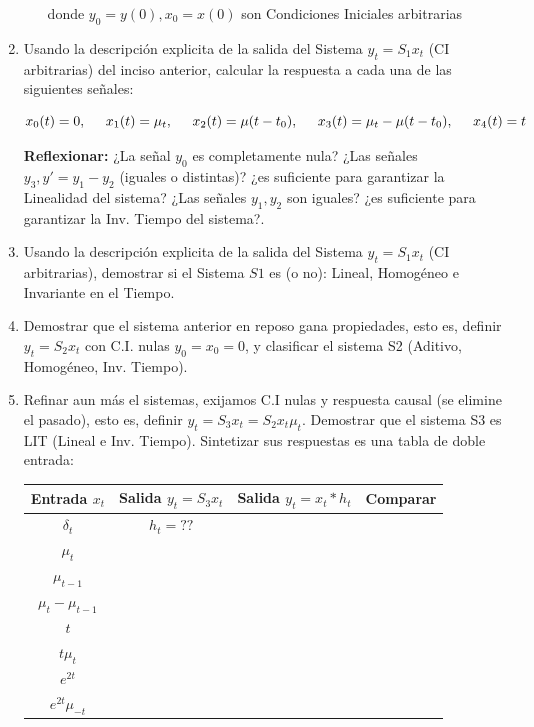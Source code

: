 \documentclass[12pt,a4paper]{report}
\begin{document}
\begin{enumerate}[label=\alph*)]
\begin{itemize}
          donde $y_0 = y(0), x_0 = x(0)$ son Condiciones Iniciales arbitrarias
        \end{itemize}

    \item Usando la descripción explicita de la salida del Sistema $y_t = S_1{x_t}$ (CI arbitrarias) del inciso
      anterior, calcular la respuesta a cada una de las siguientes señales:

      $$x_0(t) = 0, \hspace{0.5cm}x_1(t) = \mu_t, \hspace{0.5cm}x_2(t) = \mu(t - t_0), \hspace{0.5cm}x_3(t) =
      \mu_t - \mu(t - t_0), \hspace{0.5cm}x_4(t) = t$$

      \textbf{Reflexionar:} ¿La señal $y_0$ es completamente nula? ¿Las señales $y_3, y' = y_1 - y_2$ (iguales o
      distintas)? ¿es suficiente para garantizar la Linealidad del sistema? ¿Las señales $y_1, y_2$ son iguales? ¿es
      suficiente para garantizar la Inv. Tiempo del sistema?.

    \item Usando la descripción explicita de la salida del Sistema $y_t = S_1{x_t}$ (CI arbitrarias), demostrar si el
      Sistema $S1$ es (o no): Lineal, Homogéneo e Invariante en el Tiempo.

    \item Demostrar que el sistema anterior en reposo gana propiedades, esto es, definir $y_t = S_2{x_t}$ con C.I. 
      nulas $y_0 = x_0 = 0$, y clasificar el sistema S2 (Aditivo, Homogéneo, Inv. Tiempo).

    \item Refinar aun más el sistemas, exijamos C.I nulas y respuesta causal (se elimine el pasado), esto es, definir 
      $y_t = S_3{x_t} = S_2{x_t} \mu_t$. Demostrar que el sistema S3 es LIT (Lineal e Inv. Tiempo). Sintetizar sus 
      respuestas es una tabla de doble entrada:

      \begin{table}[h!]
        \centering
        \begin{tabular}{|c|c|c|c|}
          \hline
          \textbf{Entrada $x_t$} & \textbf{Salida $y_t = S_3{x_t}$} & \textbf{Salida $y_t = x_t * h_t$} & \textbf{Comparar}\\
          \hline
          $\delta_t$ & $h_t = ??$ & &\\
          \hline
          $\mu_t$ & & &\\
          \hline
          $\mu_{t-1}$ & & &\\
          \hline
          $\mu_t - \mu_{t-1}$ & & &\\
          \hline
          $t$ & & &\\
          \hline
          $t\mu_{t}$ & & &\\
          \hline
          $e^{2t}$ & & &\\
          \hline
          $e^{2t}\mu_{-t}$ & & &\\
          \hline


\end{tabular}
\end{table}
\end{enumerate}
\end{document}
